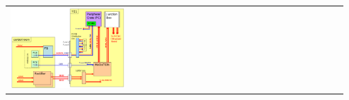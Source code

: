 \documentclass[compress]{beamer}
\begin{document}
\begin{frame}
\begin{tabular}{p{0.35\linewidth} p{0.6\linewidth}}
\begin{minipage}{\linewidth}
    \includegraphics[width=\linewidth]{plots/lowvolt/low_voltage_system}
  \end{minipage}
\end{tabular}
\end{frame}
\end{document}
